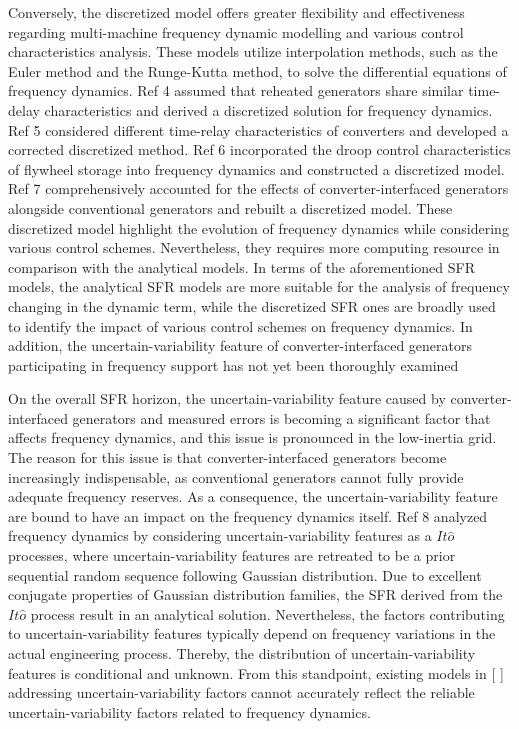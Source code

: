 \documentclass[lettersize,journal]{IEEEtran}
\begin{document}
Conversely, the discretized model offers greater flexibility and effectiveness regarding multi-machine frequency dynamic modelling and various control characteristics analysis.  These models utilize
interpolation methods, such as the Euler method and the Runge-Kutta method, to solve the differential equations of frequency dynamics.  Ref 4 assumed that reheated generators share similar time-delay
characteristics and derived a discretized solution for  frequency dynamics.  Ref 5 considered different time-relay characteristics of converters and developed a corrected discretized method. Ref 6
incorporated the droop control characteristics of flywheel storage into frequency dynamics and constructed a discretized model. Ref 7 comprehensively accounted for the effects of converter-interfaced
generators alongside conventional generators and rebuilt a discretized model. These discretized model highlight the evolution of frequency dynamics while considering various control schemes.
Nevertheless, they requires more computing resource in comparison with the analytical models. In terms of the aforementioned SFR models, the analytical SFR models are more suitable for the analysis of
frequency changing in the dynamic term, while the discretized SFR ones are broadly used to identify the impact of various control schemes on frequency dynamics. In addition, the uncertain-variability
feature of converter-interfaced generators participating in frequency support has not yet been thoroughly examined

On the overall SFR horizon, the uncertain-variability feature caused by converter-interfaced generators and measured errors is becoming a significant factor that affects frequency dynamics, and this
issue is pronounced in the low-inertia grid. The reason for this issue is that converter-interfaced generators become increasingly indispensable, as conventional generators cannot fully provide
adequate frequency reserves. As a consequence, the uncertain-variability feature are bound to have an impact on the frequency dynamics itself.  Ref 8 analyzed frequency dynamics by considering
uncertain-variability features as a \(It\widehat{o}\) processes, where uncertain-variability features are retreated to be a prior sequential random sequence following Gaussian distribution. Due to
excellent conjugate properties of Gaussian distribution families, the SFR derived from the \(It\widehat{o}\) process result in an analytical solution.  Nevertheless, the factors contributing to
uncertain-variability features typically depend on frequency variations in the actual engineering process. Thereby, the distribution of uncertain-variability features is conditional and unknown. From
this standpoint, existing models in [ ] addressing uncertain-variability factors cannot accurately reflect the reliable uncertain-variability factors related to frequency dynamics.
\end{document}
